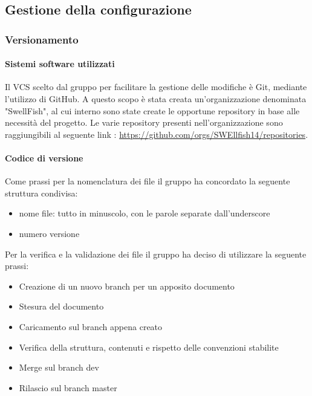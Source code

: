 \documentclass[12pt]{article}
\begin{document}
\subsection{Gestione della configurazione}
\subsubsection{Versionamento}
\paragraph{Sistemi software utilizzati}
Il VCS scelto dal gruppo per facilitare la gestione delle modifiche è Git, mediante l'utilizzo di GitHub.
A questo scopo è stata creata un'organizzazione denominata "SwellFish", al cui interno sono state create le opportune repository in base alle necessità del progetto.
Le varie repository presenti nell'organizzazione sono raggiungibili al seguente link : \url{https://github.com/orgs/SWEllfish14/repositories}.

\paragraph{Codice di versione}
Come prassi per la nomenclatura dei file il gruppo ha concordato la seguente struttura condivisa:
\begin{itemize}
    \item nome file: tutto in minuscolo, con le parole separate dall'underscore
    \item numero versione
\end{itemize}

Per la verifica e la validazione dei file il gruppo ha deciso di utilizzare la seguente prassi:
\begin{itemize}
    \item Creazione di un nuovo branch per un apposito documento
    \item Stesura del documento
    \item Caricamento sul branch appena creato
    \item Verifica della struttura, contenuti e rispetto delle convenzioni stabilite
    \item Merge sul branch dev
    \item Rilascio sul branch master
\end{itemize}
\end{document}

